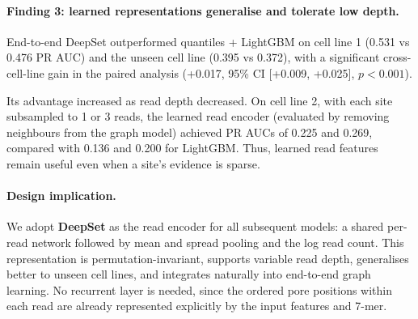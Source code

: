 \documentclass[11pt,a4paper]{article}
\begin{document}
\paragraph{Finding 3: learned representations generalise and tolerate low depth.}
End-to-end DeepSet outperformed quantiles + LightGBM on cell line 1 (0.531 vs 0.476 PR AUC) and the unseen cell line (0.395 vs 0.372), with a significant cross-cell-line gain in the paired analysis (+0.017, 95\% CI [+0.009, +0.025], $p<0.001$).

Its advantage increased as read depth decreased. On cell line 2, with each site subsampled to 1 or 3 reads, the learned read encoder (evaluated by removing neighbours from the graph model) achieved PR AUCs of 0.225 and 0.269, compared with 0.136 and 0.200 for LightGBM. Thus, learned read features remain useful even when a site's evidence is sparse.

\paragraph{Design implication.}
We adopt \textbf{DeepSet} as the read encoder for all subsequent models: a shared per-read network followed by mean and spread pooling and the log read count. This representation is permutation-invariant, supports variable read depth, generalises better to unseen cell lines, and integrates naturally into end-to-end graph learning. No recurrent layer is needed, since the ordered pore positions within each read are already represented explicitly by the input features and 7-mer.
\end{document}
